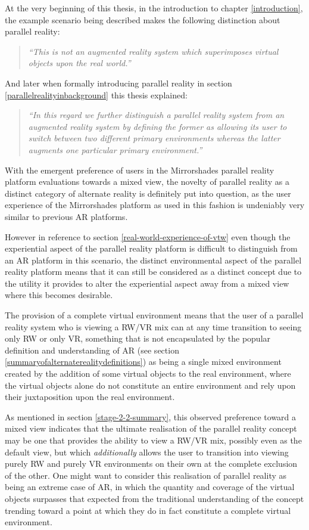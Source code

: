 At the very beginning of this thesis, in the introduction to chapter \ref{introduction}, the example scenario being described makes the following distinction about parallel reality:

\begin{quote}
	\textit{``This is not an augmented reality system which superimposes virtual objects upon the real world.''}
\end{quote}

And later when formally introducing parallel reality in section \ref{parallelrealityinbackground} this thesis explained:

\begin{quote}
	\textit{``In this regard we further distinguish a parallel reality system from an augmented reality system by defining the former as allowing its user to switch between two different primary environments whereas the latter augments one particular primary environment.''}
\end{quote}

With the emergent preference of users in the Mirrorshades parallel reality platform evaluations towards a mixed view, the novelty of parallel reality as a distinct category of alternate reality is definitely put into question, as the user experience of the Mirrorshades platform as used in this fashion is undeniably very similar to previous AR platforms.

However in reference to section \ref{real-world-experience-of-vtw} even though the experiential aspect of the parallel reality platform is difficult to distinguish from an AR platform in this scenario, the distinct environmental aspect of the parallel reality platform means that it can still be considered as a distinct concept due to the utility it provides to alter the experiential aspect away from a mixed view where this becomes desirable.

The provision of a complete virtual environment means that the user of a parallel reality system who is viewing a RW/VR mix can at any time transition to seeing only RW or only VR, something that is not encapsulated by the popular definition and understanding of AR (see section \ref{summaryofalternaterealitydefinitions}) as being a single mixed environment created by the addition of some virtual objects to the real environment, where the virtual objects alone do not constitute an entire environment and rely upon their juxtaposition upon the real environment.

As mentioned in section \ref{stage-2-2-summary}, this observed preference toward a mixed view indicates that the ultimate realisation of the parallel reality concept may be one that provides the ability to view a RW/VR mix, possibly even as the default view, but which \textit{additionally} allows the user to transition into viewing purely RW and purely VR environments on their own at the complete exclusion of the other. One might want to consider this realisation of parallel reality as being an extreme case of AR, in which the quantity and coverage of the virtual objects surpasses that expected from the traditional understanding of the concept trending toward a point at which they do in fact constitute a complete virtual environment.

